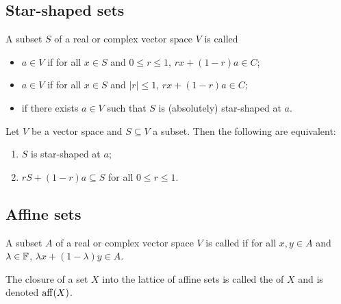 \subsection{Star-shaped sets}
\begin{definition}
A subset $S$ of a real or complex vector space $V$ is called
\begin{itemize}
\item {} $a\in V$ if for all $x\in S$ and $0\leq r \leq 1$, $rx + (1-r)a\in C$;
\item {} $a\in V$ if for all $x\in S$ and $|r| \leq 1$, $rx + (1-r)a\in C$;
\item {} if there exists $a\in V$ such that $S$ is (absolutely) star-shaped at $a$.
\end{itemize}
\end{definition}

\begin{lemma}
Let $V$ be a vector space and $S\subseteq V$ a subset. Then the following are equivalent:
\begin{enumerate}
\item $S$ is star-shaped at $a$;
\item $r S + (1-r)a \subseteq S$ for all $0\leq r \leq 1$.
\end{enumerate}
\end{lemma}

\subsection{Affine sets}
\begin{definition}
A subset $A$ of a real or complex vector space $V$ is called  if for all $x,y\in A$ and $\lambda\in\mathbb{F}$, $\lambda x + (1-\lambda)y\in A$.

The closure of a set $X$ into the lattice of affine sets is called the  of $X$ and is denoted $\operatorname{aff}(X)$.
\end{definition}


